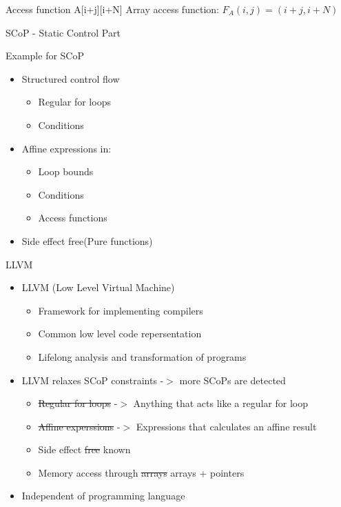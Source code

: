 \documentclass{beamer}
\begin{document}
\begin{frame}{Access function}
A[i+j][i+N]
\linebreak\linebreak
Array access function: $F_A(i,j) = (i+j,i+N)$ 
\linebreak\linebreak
{\textbf {\color{red}{Change array access function for better locality}}} \\
\end{frame}

\begin{frame}{SCoP - Static Control Part}
\begin{block}{Example for SCoP}
{}
\end{block}

\begin{itemize}
\item Structured control flow
	\begin{itemize}
	\item Regular for loops
	\item Conditions
	\end{itemize}
\item Affine expressions in:
	\begin{itemize}
	\item Loop bounds
	\item Conditions
	\item Access functions
	\end{itemize}
\item Side effect free(Pure functions)
\end{itemize}

\end{frame}

\begin{frame}{LLVM}
\begin{itemize}
\item LLVM (Low Level Virtual Machine)
	\begin{itemize}
	\item Framework for implementing compilers
	\item Common low level code repersentation
	\item Lifelong analysis and transformation of programs
	\end{itemize}
\item LLVM relaxes SCoP constraints -$>$ more SCoPs are detected
	\begin{itemize}
	\item \sout{Regular for loops} -$>$ Anything that acts like a regular for loop
	\item \sout{Affine experssions} -$>$ Expressions that calculates an affine result
	\item Side effect \sout{free} known
	\item Memory access through \sout{arrays} arrays + pointers
	\end{itemize}
\item Independent of programming language
\end{itemize}
\end{frame}
\end{document}
